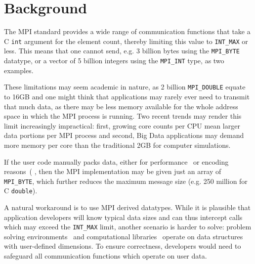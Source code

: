 
\section{Background}

The MPI standard provides a wide range of communication functions that
take a C \texttt{int} argument for the element count, thereby limiting this
value to \texttt{INT\_MAX} or less.
This means that one cannot send, e.g. 3 billion bytes using the \texttt{MPI\_BYTE} 
datatype, or a vector of 5 billion integers using the \texttt{MPI\_INT} type, as
two examples.

These limitations may seem academic in nature, as 2 billion
\texttt{MPI\_DOUBLE} equate to 16GB and one might think that
applications may rarely ever need to transmit that much data, as there
may be less memory available for the whole address space in which the MPI
process is running.
Two recent trends may render this limit increasingly impractical: 
first, growing core counts per CPU mean larger data portions per MPI 
process and second, Big Data applications may demand more memory 
per core than the traditional 2GB for computer simulations.

If the user code manually packs data, either for
performance~\cite{jenkins2012enabling} or encoding
reasons~(\cite{boostmpi} \cite{li:PnetCDF},
 then the MPI implementation may be given just
an array of \texttt{MPI\_BYTE}, which further reduces the maximum
message size (e.g. 250 million for C \texttt{double}).

A natural workaround is to use MPI derived datatypes. While it is
plausible that application developers will know typical data sizes and
can thus intercept calls which may exceed the \texttt{INT\_MAX} limit,
another scenario is harder to solve: problem solving
environments~\cite{cactus:SC01, gromacs} and computational
libraries~\cite{physis, libgeodecomp} operate on data structures with
user-defined dimensions. To ensure correctness, developers would need
to safeguard all communication functions which operate on user data.

%

